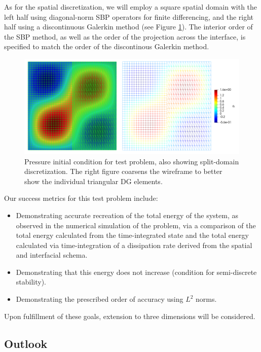 As for the spatial discretization, we will employ a square spatial domain
with the left half using diagonal-norm SBP operators for finite differencing,
and the right half using a discontinuous Galerkin method (see Figure \ref{fig:split_domain}). The interior order
of the SBP method, as well as the order of the projection across the interface,
is specified to match the order of the discontinous Galerkin method.
\begin{figure}
\centering
\includegraphics[width=0.9\linewidth,trim=4 4 4 4,clip]{figures/split_domain_wave_double.png}
\caption{Pressure initial condition for test problem, also showing split-domain
	 discretization. The right figure coarsens the wireframe to better show the
	 individual triangular DG elements.}
\label{fig:split_domain}
\end{figure}
Our success metrics for this test problem include:
\begin{itemize}
\item{Demonstrating accurate recreation of the total energy of the system, as observed in the
      numerical simulation of the problem, via a comparison of the total energy calculated from the
      time-integrated state and the total energy calculated via time-integration of a dissipation rate
      derived from the spatial and interfacial schema.}
\item{Demonstrating that this energy does not increase (condition for semi-discrete stability).}
\item{Demonstrating the prescribed order of accuracy using $L^2$ norms.}
\end{itemize}
Upon fulfillment of these goals, extension to three dimensions will be considered.

\subsection{Outlook}


